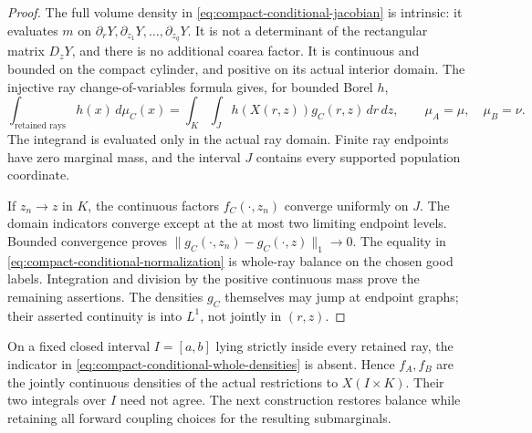\documentclass[11pt,reqno]{amsart}
\theoremstyle{definition}
\theoremstyle{remark}
\numberwithin{equation}{section}
\begin{document}
\begin{proof}
The full volume density in
\eqref{eq:compact-conditional-jacobian} is intrinsic: it evaluates
\(m\) on \(\partial_rY,\partial_{z_1}Y,\ldots,\partial_{z_q}Y\).
It is not a determinant of the rectangular matrix \(D_zY\), and
there is no additional coarea factor. It is continuous and bounded
on the compact cylinder, and positive on its actual interior domain.
The injective ray change-of-variables formula
\cite[Proposition~4.18(iv), equation~(4.13)]{Assouline} gives, for
bounded Borel \(h\),
\[
 \int_{\text{retained rays}}h(x)\,d\mu_C(x)
   =\int_K\int_J h(X(r,z))g_C(r,z)\,dr\,dz,
 \qquad \mu_A=\mu,\quad\mu_B=\nu.
\]
The integrand is evaluated only in the actual ray domain.
Finite ray endpoints have zero marginal mass, and the interval \(J\)
contains every supported population coordinate.

If \(z_n\to z\) in \(K\), the continuous factors \(f_C(\cdot,z_n)\)
converge uniformly on \(J\). The domain indicators converge except
at the at most two limiting endpoint levels. Bounded convergence
proves \(\|g_C(\cdot,z_n)-g_C(\cdot,z)\|_1\to0\).
The equality in \eqref{eq:compact-conditional-normalization} is
whole-ray balance on the chosen good labels. Integration and division
by the positive continuous mass prove the remaining assertions.
The densities \(g_C\) themselves may jump at endpoint graphs;
their asserted continuity is into \(L^1\), not jointly in \((r,z)\).
\end{proof}

On a fixed closed interval \(I=[a,b]\) lying strictly inside every
retained ray, the indicator in
\eqref{eq:compact-conditional-whole-densities} is absent. Hence
\(f_A,f_B\) are the jointly continuous densities of the actual
restrictions to \(X(I\times K)\). Their two integrals over \(I\)
need not agree. The next construction restores balance while retaining
all forward coupling choices for the resulting submarginals.
\end{document}
